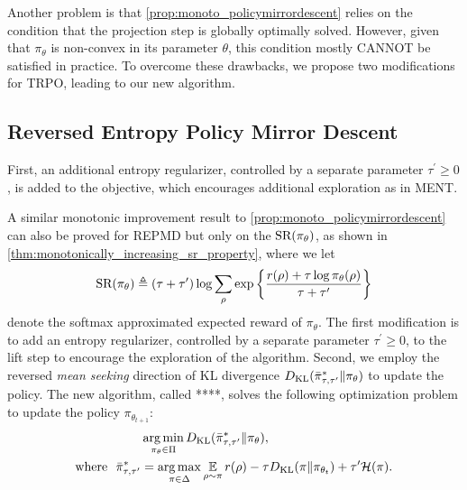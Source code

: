 \documentclass{article} %
\newcommand{\todor}[2][]{\todo[color=blue!25,size=\small,#1]{Ruitong: #2}}
\begin{document}
Another problem is that \cref{prop:monoto_policymirrordescent} relies on the condition that the projection step is globally optimally solved.
However, given that $\pi_\theta$ is non-convex in its parameter $\theta$, this condition mostly CANNOT be satisfied in practice.
To overcome these drawbacks, we propose two modifications for TRPO, leading to our new algorithm.

\subsection{Reversed Entropy Policy Mirror Descent \todor[]{Again, new name}}
\label{sec:repmd}
First, an additional entropy regularizer, controlled by a separate parameter $\tau^{\prime}\geq 0$, is added to the objective, which encourages additional exploration as in MENT.

A similar monotonic improvement result to \cref{prop:monoto_policymirrordescent} can also be proved for REPMD but only on the $\text{SR}(\pi_\theta) $, as shown in \cref{thm:monotonically_increasing_sr_property}, where we let
\begin{equation*}
\text{SR}(\pi_\theta) \triangleq (\tau + \tau^{\prime})\log{ \sum_{\rho}{ \exp\left\{ \frac{r(\rho) + \tau \log{\pi_\theta(\rho)} }{\tau + \tau^{\prime}} \right\} }}
\end{equation*}
denote the softmax approximated expected reward of $\pi_\theta$.
\fi
The first modification is to add an entropy regularizer, controlled by a separate parameter $\tau^{\prime}\geq 0$, to the lift step to encourage the exploration of the algorithm. 
Second, we employ the reversed \emph{mean seeking} direction of KL divergence $D_{\mathrm{KL}}(\bar{\pi}_{\tau,\tau^{\prime}}^* \| \pi_\theta)$ to update the policy.
The new algorithm, called ****, solves the following optimization problem to update the policy $\pi_{\theta_{t+1}}$:
\begin{equation}
\label{eq:repmd}
\begin{split}
&\operatorname*{arg\,min}\limits_{\pi_\theta \in \Pi}{D_{\mathrm{KL}}(\bar{\pi}_{\tau,\tau^{\prime}}^* \| \pi_\theta) }, \\
\text{where}\ \ \bar{\pi}_{\tau,\tau^{\prime}}^* & =  \operatorname*{arg\,max}\limits_{\pi \in \Delta}{ \operatorname*{\mathbb{E}}\limits_{\rho \sim \pi}{  r(\rho)  - \tau D_{\mathrm{KL}}(\pi \| \pi_{\theta_t}) + \tau^{\prime} \mathcal{H}(\pi)} }.
\end{split}
\end{equation}
\end{document}
